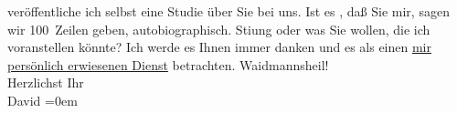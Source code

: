 \begin{ledgroupsized}[t]{13cm}
                    veröffentliche ich selbst eine Studie über Sie bei uns. Ist es \label{K_L00500_2v}\label{K_L00500_2h}, daß Sie mir, sagen wir 100 Zeilen geben,
                    autobiographisch. Sti{\geminationm}ung oder was Sie wollen, die
                    ich voranstellen könnte? Ich werde {\pb}es Ihnen immer danken und es als einen \uline{mir
                        persönlich erwiesenen Dienst} betrachten.\pend
           \pstart
           Waidmannsheil!{\\[\baselineskip]}Herzlichst Ihr{\\[\baselineskip]}\spacefill\mbox{David}\pend
           \leftskip=0em{}          \endnumbering{}\end{ledgroupsized}  \newcommand{\dateiname}{L00500}\newcommand{\titel}{Jakob Julius David an Arthur Schnitzler, [5. 10. 1895]}\newcommand{\editorInnen}{Martin Anton Müller und Gerd-Hermann Susen}
            \footnotesize
\begin{ledgroupsized}[t]{11.5cm}
\end{ledgroupsized}
         
      